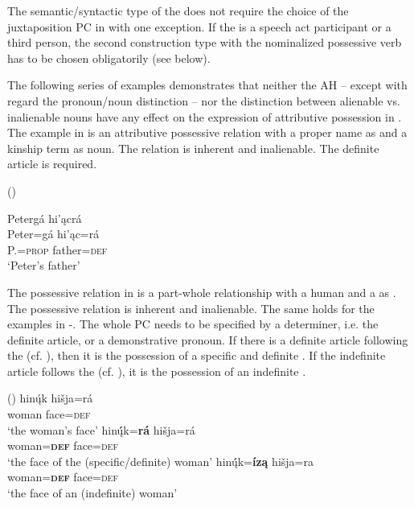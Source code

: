 \documentclass[output=paper]{LSP/langsci}
\begin{document}
The semantic/syntactic type of the  does not require the choice of the juxtaposition PC in  with one exception. If the  is a speech act participant or a third person, the second construction type with the nominalized possessive verb has to be chosen obligatorily (see  below).

The following series of examples demonstrates that neither the AH – except with regard the pronoun/noun distinction – nor the distinction between alienable vs. inalienable nouns have any effect on the expression of attributive possession in . The example in  is an attributive possessive relation with a proper name as  and a kinship term as  noun. The relation is inherent and inalienable. The definite article is required.

\ea {} (\citealt[16]{Helmbrecht2003}) \label{petersfather}

\glll Petergá hi'\k{a}crá\\
Peter=gá       hi'\k{a}c=rá \\
  P.=\textsc{prop} father=\textsc{def} \\
\glt`Peter's father'
\z

The possessive relation in  is a part-whole relationship with a human  and a  as . The possessive relation is inherent and inalienable. The same holds for the examples in -. The whole PC needs to be specified by a determiner, i.e. the definite article, or a demonstrative pronoun. If there is a definite article following the  (cf. ), then it is the possession of a specific and definite . If the indefinite article follows the  (cf. ), it is the possession of an indefinite . 

\ea {} (\citealt[13]{Helmbrecht2003})\label{womansface}
\ea \label{womansfacea}
\gll hinų́k    hišja=rá \\
woman face=\textsc{def} \\
\glt `the woman's face'
\ex\label{womansfaceb}
\gll hinų́́k=\textbf{rá}         hišja=rá \\
woman=\textbf{\textsc{def}} face=\textsc{def} \\
\trans `the face of the (specific/definite) woman'
\ex\label{womansfacec}
\gll hinų́́k=\textbf{íz\k{a}} hišja=ra \\
woman=\textbf{\textsc{def}}  face=\textsc{def} \\ 
\glt `the face of an (indefinite) woman'
\z
\z
\end{document}
